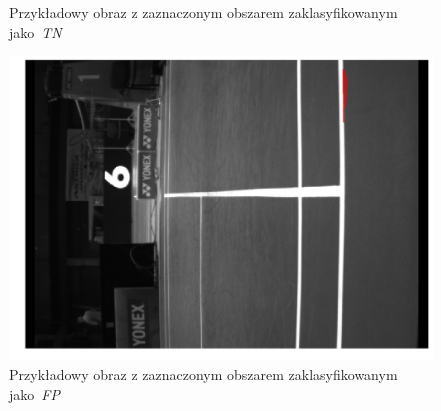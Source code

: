 \begin{figure}[!htb]
    \caption{Przykładowy obraz z zaznaczonym obszarem zaklasyfikowanym jako~\textit{TN}}
    \label{fig:TN}
  \endminipage\hfill
    \includegraphics[width=\linewidth]{FP_frame_8.jpg}
    \caption{Przykładowy obraz z zaznaczonym obszarem zaklasyfikowanym jako~\textit{FP}}
    \label{fig:FP}
  \endminipage\hfill
\end{figure}
